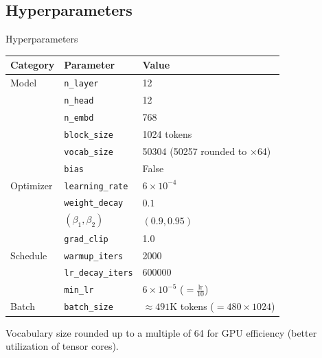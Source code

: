 \subsection{Hyperparameters}

\begin{frame}{Hyperparameters}

  \begin{center}
  \begin{tabular}{lll}
    \toprule
    \textbf{Category} & \textbf{Parameter} & \textbf{Value} \\
    \midrule
    Model     & \texttt{n\_layer}        & 12 \\
              & \texttt{n\_head}         & 12 \\
              & \texttt{n\_embd}         & 768 \\
              & \texttt{block\_size}     & 1024 tokens \\
              & \texttt{vocab\_size}     & 50304 (50257 rounded to $\times$64) \\
              & \texttt{bias}            & False \\
    \midrule
    Optimizer & \texttt{learning\_rate}  & $6 \times 10^{-4}$ \\
              & \texttt{weight\_decay}   & $0.1$ \\
              & $(\beta_1, \beta_2)$     & $(0.9, 0.95)$ \\
              & \texttt{grad\_clip}      & 1.0 \\
    \midrule
    Schedule  & \texttt{warmup\_iters}   & 2000 \\
              & \texttt{lr\_decay\_iters}& 600000 \\
              & \texttt{min\_lr}         & $6 \times 10^{-5}$ ($= \frac{\text{lr}}{10}$) \\
    \midrule
    Batch     & \texttt{batch\_size}     & $\approx 491$K tokens ($= 480 \times 1024$) \\
    \bottomrule
  \end{tabular}
  \end{center}

  Vocabulary size rounded up to a multiple of 64 for GPU efficiency (better utilization of tensor cores).
\end{frame}
